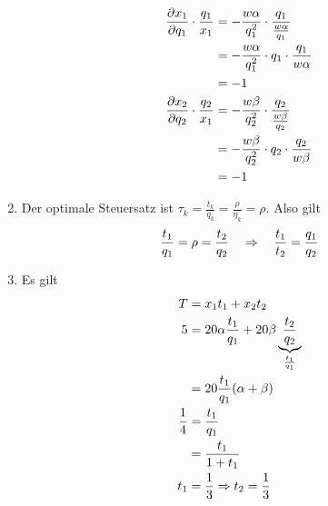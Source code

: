 \documentclass{article}
\begin{document}
\begin{enumerate}[label=(\alph*)]
		\begin{align}
			\frac{\partial x_1}{\partial q_1}\cdot\frac{q_1}{x_1} &= -\frac{w\alpha}{q_1^2}\cdot\frac{q_1}{\frac{w\alpha}{q_1}} \notag \\
			&= -\frac{w\alpha}{q_1^2}\cdot q_1\cdot\frac{q_1}{w\alpha} \notag \\
			&= -1 \notag \\
			\frac{\partial x_2}{\partial q_2}\cdot\frac{q_2}{x_1} &= -\frac{w\beta}{q_2^2}\cdot\frac{q_2}{\frac{w\beta}{q_2}} \notag \\
			&= -\frac{w\beta}{q_2^2} \cdot q_2\cdot\frac{q_2}{w\beta} \notag \\
			&= -1 \notag
		\end{align}
		\item Der optimale Steuersatz ist $\tau_k=\frac{t_k}{q_k}=\frac{\rho}{\eta_k}=\rho$. Also gilt
		\begin{align}
			\frac{t_1}{q_1} = \rho = \frac{t_2}{q_2} \quad\Rightarrow\quad \frac{t_1}{t_2}=\frac{q_1}{q_2} \notag
		\end{align}
		\item Es gilt
		\begin{align}
			T &= x_1t_1 + x_2t_2 \notag \\
			5 &= 20\alpha\frac{t_1}{q_1} + 20\beta\underbrace{\frac{t_2}{q_2}}_{\frac{t_1}{q_1}} \notag \\
			&= 20\frac{t_1}{q_1}(\alpha + \beta) \notag \\
			\frac{1}{4} &= \frac{t_1}{q_1} \notag \\
			&= \frac{t_1}{1+t_1} \notag \\
			t_1 &= \frac{1}{3} \Rightarrow t_2 = \frac{1}{3} \notag
		\end{align}
	\end{enumerate}
	
\end{document}
